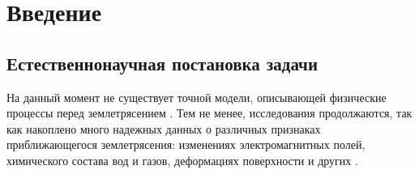 \documentclass[14pt]{mmcs_article}
\begin{document}





\newpage
{}
\section*{Введение}
\subsection*{Естественнонаучная постановка задачи}

На данный момент не существует точной модели, описывающей физические процессы перед землетрясением \cite{Rodkin2011}. Тем не менее, исследования продолжаются, так как накоплено много надежных данных о различных признаках приближающегося землетрясения: изменениях электромагнитных полей, химического состава вод и газов, деформациях поверхности и других \cite{Cicerone2009, Geller1997, Conti2021, Chiodini2020}.
\end{document}
